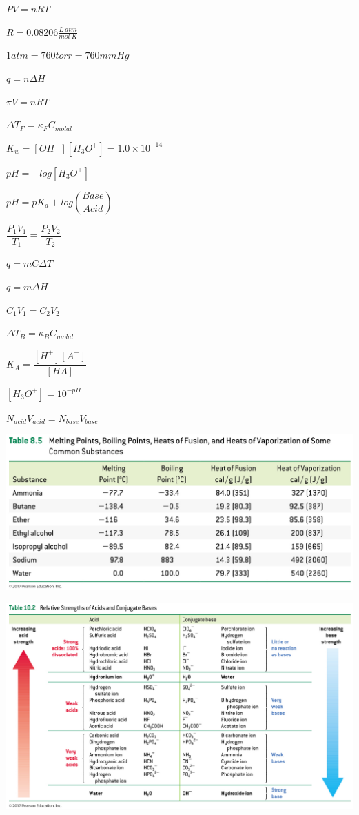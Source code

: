 \documentclass[12pt, letterpaper]{memoir}
\begin{document}
	\pagestyle{empty}
	\begin{minipage}{0.5\linewidth}
		$PV=nRT$		
		
		$R=0.08206\frac{L~atm}{mol~K}$
		
		$1atm=760torr=760mmHg$
			
		$q=n\Delta H$
	
		$\pi V=nRT$
	
		$\Delta T_F=\kappa_FC_{molal}$
		
		$K_w=\left[OH^-\right]\left[H_3O^+\right]=1.0\times10^{-14}$
		
		$pH=-log\left[H_3O^+\right]$
		
		$pH=pK_a+log\left(\dfrac{Base}{Acid}\right)$
	\end{minipage}
	\begin{minipage}{0.5\linewidth}
		$\dfrac{P_1V_1}{T_1}=\dfrac{P_2V_2}{T_2}$
		
		$q=mC\Delta T$
		
		$q=m\Delta H$
		
		$C_1V_1=C_2V_2$
		
		$\Delta T_B=\kappa_BC_{molal}$
		
		$K_A=\dfrac{\left[H^+\right]\left[A^-\right]}{\left[HA\right]}$
		
		$\left[H_3O^+\right]=10^{-pH}$
		
		$N_{acid}V_{acid}=N_{base}V_{base}$
	
	\end{minipage}

	\vspace{4em}
	
	\noindent\includegraphics[width=\textwidth]{08_05_Table}
	
	\noindent\includegraphics[width=\textwidth]{10_02_Table}
	
\end{document}

